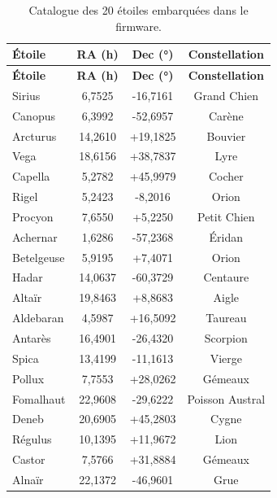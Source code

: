\documentclass[12pt,a4paper]{report}
\begin{document}
\begin{enumerate}
\begin{longtable}{|l|c|c|c|}
    \caption{Catalogue des 20 étoiles embarquées dans le firmware.}\label{tab:catalogue}\\
    \hline
    \textbf{Étoile} & \textbf{RA (h)} & \textbf{Dec (°)} & \textbf{Constellation} \\
    \hline
    \endfirsthead
    \hline
    \textbf{Étoile} & \textbf{RA (h)} & \textbf{Dec (°)} & \textbf{Constellation} \\
    \hline
    \endhead
    Sirius & 6,7525 & -16,7161 & Grand Chien \\
    Canopus & 6,3992 & -52,6957 & Carène \\
    Arcturus & 14,2610 & +19,1825 & Bouvier \\
    Vega & 18,6156 & +38,7837 & Lyre \\
    Capella & 5,2782 & +45,9979 & Cocher \\
    Rigel & 5,2423 & -8,2016 & Orion \\
    Procyon & 7,6550 & +5,2250 & Petit Chien \\
    Achernar & 1,6286 & -57,2368 & Éridan \\
    Betelgeuse & 5,9195 & +7,4071 & Orion \\
    Hadar & 14,0637 & -60,3729 & Centaure \\
    Altaïr & 19,8463 & +8,8683 & Aigle \\
    Aldebaran & 4,5987 & +16,5092 & Taureau \\
    Antarès & 16,4901 & -26,4320 & Scorpion \\
    Spica & 13,4199 & -11,1613 & Vierge \\
    Pollux & 7,7553 & +28,0262 & Gémeaux \\
    Fomalhaut & 22,9608 & -29,6222 & Poisson Austral \\
    Deneb & 20,6905 & +45,2803 & Cygne \\
    Régulus & 10,1395 & +11,9672 & Lion \\
    Castor & 7,5766 & +31,8884 & Gémeaux \\
    Alnaïr & 22,1372 & -46,9601 & Grue \\
    \hline
\end{longtable}


\end{enumerate}
\end{document}
